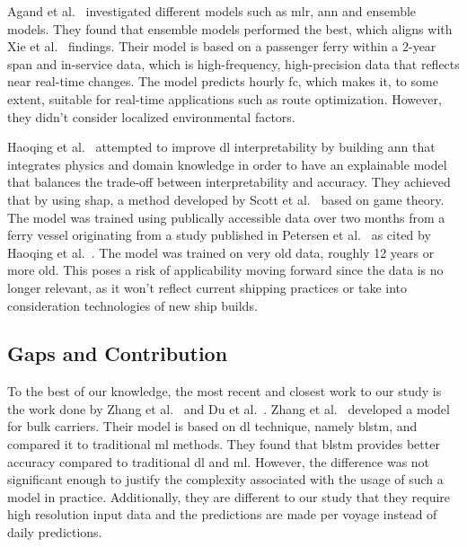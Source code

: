 Agand et al.~\citep{agandFuelConsumptionPrediction2023} investigated different models such as \ac{mlr}, \ac{ann} and ensemble models. They found that ensemble models performed the best, which aligns with Xie et al.~\citep{xieFuelConsumptionPrediction2023} findings. 
Their model is based on a passenger ferry within a 2-year span and in-service data, which is high-frequency, high-precision data that reflects near real-time changes. 
The model predicts hourly \ac{fc}, which makes it, to some extent, suitable for real-time applications such as route optimization. However, they didn't consider localized environmental factors.

Haoqing et al.~\citep{WANG2023104361} attempted to improve \ac{dl} interpretability by building \ac{ann} that integrates physics and domain knowledge in order to have an explainable model that balances 
the trade-off between interpretability and accuracy. They achieved that by using \ac{shap}, a method developed by Scott et al.~\citep{lundberg2017unified} based on game theory. 
The model was trained using publically accessible data over two months from a ferry vessel originating from a study published in Petersen et al.~\citep{petersen2012machine} as cited by Haoqing et al.~\citep{WANG2023104361}. 
The model was trained on very old data, roughly 12 years or more old. This poses a risk of applicability moving forward since the data is no longer relevant, as it won't reflect current shipping practices or take into consideration technologies of new ship builds. 

\subsection{Gaps and Contribution}\label{sec:gaps_and_contribution}

To the best of our knowledge, the most recent and closest work to our study is the work done by Zhang et al.~\citep{zhangDeepLearningMethod2024} and Du et al.~\citep{duDataFusionMachine2022a}. 
Zhang et al.~\citep{zhangDeepLearningMethod2024} developed a model for bulk carriers. Their model is based on \ac{dl} technique, namely \ac{blstm}, and compared it to traditional \ac{ml} methods. 
They found that \ac{blstm} provides better accuracy compared to traditional \ac{dl} and \ac{ml}. However, the difference was not significant enough to justify the 
complexity associated with the usage of such a model in practice. Additionally, they are different to our study that they require high resolution input data and the predictions 
are made per voyage instead of daily predictions. 

